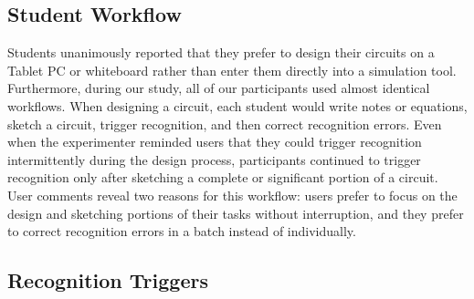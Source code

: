 \documentclass{egpubl}
\begin{document}
\subsection{Student Workflow}

Students unanimously reported that they prefer to design their
circuits on a Tablet PC or whiteboard rather than enter them directly
into a simulation tool.  Furthermore, during our study, all of our
participants used almost identical workflows.  When designing a
circuit, each student would write notes or equations, sketch a
circuit, trigger recognition, and then correct recognition errors.
Even when the experimenter reminded users that they could trigger
recognition intermittently during the design process, participants
continued to trigger recognition only after sketching a complete or
significant portion of a circuit.  User comments reveal two reasons
for this workflow: users prefer to focus on the design and
sketching portions of their tasks without interruption, and they
prefer to correct recognition errors in a batch instead of
individually.  



\subsection{Recognition Triggers}

\end{document}
